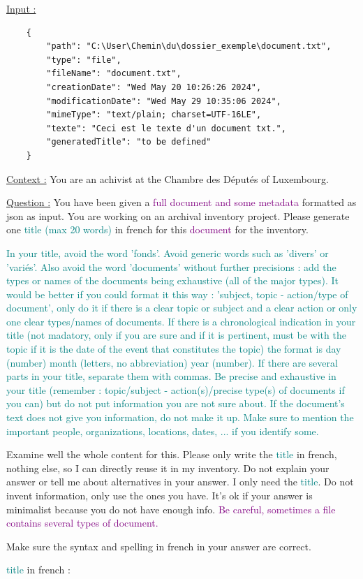  
\begin{tcolorbox}[colback=white, colbacktitle=white, coltitle=black, title=Exemple de prompt]

\underline{Input :}
\begin{verbatim}
    {
        "path": "C:\User\Chemin\du\dossier_exemple\document.txt",
        "type": "file",
        "fileName": "document.txt",
        "creationDate": "Wed May 20 10:26:26 2024",
        "modificationDate": "Wed May 29 10:35:06 2024",
        "mimeType": "text/plain; charset=UTF-16LE",
        "texte": "Ceci est le texte d'un document txt.",
        "generatedTitle": "to be defined"
    }
\end{verbatim}

\underline{Context :}
You are an achivist at the Chambre des Députés of Luxembourg.

\underline{Question :}
You have been given a \textcolor{purple}{full document and some metadata} formatted as json as input. You are working on an archival inventory project.
Please generate one \textcolor{teal}{title} \textcolor{teal}{(max 20 words)} in french for this \textcolor{purple}{document} for the inventory.

\textcolor{teal}{In your title, avoid the word 'fonds'. Avoid generic words such as 'divers' or 'variés'. Also avoid the word 'documents' without further precisions : add the types or names of the documents being exhaustive (all of the major types). It would be better if you could format it this way : 'subject, topic - action/type of document', only do it if there is a clear topic or subject and a clear action or only one clear types/names of documents. If there is a chronological indication in your title (not madatory, only if you are sure and if it is pertinent, must be with the topic if it is the date of the event that constitutes the topic) the format is day (number) month (letters, no abbreviation) year (number). If there are several parts in your title, separate them with commas. Be precise and exhaustive in your title (remember : topic/subject - action(s)/precise type(s) of documents if you can) but do not put information you are not sure about. If the document's text does not give you information, do not make it up. Make sure to mention the important people, organizations, locations, dates, ... if you identify some.}

Examine well the whole content for this. Please only write the \textcolor{teal}{title} in french, nothing else, so I can directly reuse it in my inventory. 
Do not explain your answer or tell me about alternatives in your answer. I only need the \textcolor{teal}{title}. Do not invent information, only use the ones you have. 
It's ok if your answer is minimalist because you do not have enough info.
\textcolor{purple}{Be careful, sometimes a file contains several types of document.}

Make sure the syntax and spelling in french in your answer are correct.

\textcolor{teal}{title} in french :


\end{tcolorbox}

